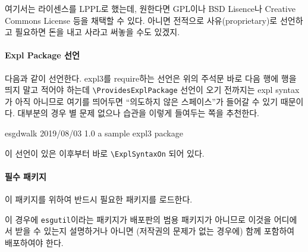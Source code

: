 \documentclass[a4paper,amsmath]{oblivoir}
\begin{document}
\begin{exampleonly}
%
%
%
%
%
% 
%
\end{exampleonly}

여기서는 라이센스를 LPPL로 했는데, 원한다면 GPL이나 BSD Lisence나 
Creative Commons License 등을 채택할 수 있다. 아니면 전적으로 사유(proprietary)로
선언하고 필요하면 돈을 내고 사라고 써놓을 수도 있겠지.

\paragraph{Expl Package 선언}

다음과 같이 선언한다. \textsf{expl3}를 require하는 선언은 위의 주석문 바로 다음 행에
행을 띄지 말고 적어야 하는데 \verb|\ProvidesExplPackage| 선언이 오기 전까지는
expl syntax가 아직 아니므로 여기를 띄어두면 “의도하지 않은 스페이스”가 들어갈
수 있기 때문이다. 대부분의 경우 별 문제 없으나 습관을 이렇게 들여두는 쪽을 추천한다.

\begin{exampleonly}
\RequirePackage{expl3,xparse,l3keys2e}
\ProvidesExplPackage
    { esgdwalk }
    { 2019/08/03 }
    { 1.0 }
    { a sample expl3 package }
\end{exampleonly}

이 선언이 있은 이후부터 바로 \verb|\ExplSyntaxOn| 되어 있다.


\paragraph{필수 패키지}

이 패키지를 위하여 반드시 필요한 패키지를 로드한다.

\begin{exampleonly}
\RequirePackage{tikz}
\RequirePackage{esgutil}
\end{exampleonly}

이 경우에 \verb|esgutil|이라는 패키지가 배포판의 범용 패키지가 아니므로 이것을 어디에서 받을 수 있는지
설명하거나 아니면 (저작권의 문제가 없는 경우에) 함께 포함하여 배포하여야 한다.
\end{document}
